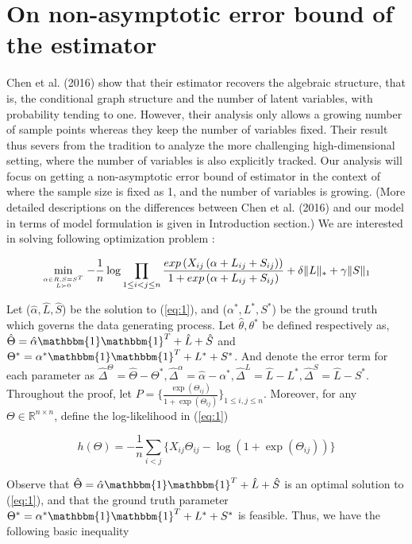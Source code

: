 \documentclass{article}
\begin{document}
\section{On non-asymptotic error bound of the estimator}
Chen et al. (2016) show that their estimator recovers the algebraic structure, that is, the conditional graph structure and the number of latent variables, with probability tending to one. However, their analysis only allows a growing number of sample points whereas they keep the number of variables fixed. Their result thus severs from the tradition to analyze the more challenging high-dimensional setting, where the number of variables is also explicitly tracked. Our analysis will focus on getting a non-asymptotic error bound of estimator in the context of where the sample size is fixed as 1, and the number of variables is growing. (More detailed descriptions on the differences between Chen et al. (2016) and our model in terms of model formulation is given in Introduction section.) We are interested in solving following optimization problem : 

\begin{equation}\label{eq:1}
\min\limits_{\alpha \in R, S = S^T \atop L \succ 0}   
-\frac{1}{n} \log \prod_{1\le i< j\le n}\frac{exp\left(X_{ij}\left(\alpha+
L_{ij}+S_{ij}\right)\right)}{1+exp\left(\alpha+
L_{ij}+S_{ij}\right)} + \delta \|L\|_\ast + \gamma \|S\|_1
\end{equation}



Let ($\hat{\alpha},\hat{L},\hat{S}$) be the solution to (\ref{eq:1}), and ($\alpha^{*},L^{*},S^{*}$) be the ground truth which governs the data generating process. Let $\hat{\theta},\theta^{*}$ be defined respectively as, $\hat{\Theta} = \hat{\alpha}\mathbbm{1}\mathbbm{1}^T+\hat{L}+\hat{S}$ and
$\Theta^{*} = \alpha^{*}\mathbbm{1}\mathbbm{1}^T+L^{*}+S^{*}$.
And denote the error term for each parameter as $\hat{\Delta}^{\Theta} = \hat{\Theta}-\Theta^{*}, 
\hat{\Delta}^{\alpha} = \hat{\alpha}-\alpha^{*},
\hat{\Delta}^L = \hat{L}-L^{*},
\hat{\Delta}^S = \hat{L}-S^{*}.$
Throughout the proof, let $P= \Big\{\frac{\exp(\Theta_{ij})}{1+\exp(\Theta_{ij})}\Big\}_{1 \leq i,j \leq n}$. Moreover, for any $\Theta \in \mathbb{R}^{n\times n}$, define the log-likelihood in (\ref{eq:1}) 

\[
h(\Theta) = -\frac{1}{n}\sum_{i<j} \Big\{ X_{ij}\Theta_{ij} - \log(1+\exp(\Theta_{ij})) \Big\}
\]

Observe that 
$\hat{\Theta} = \hat{\alpha}\mathbbm{1}\mathbbm{1}^T+\hat{L}+\hat{S}$
is an optimal solution to (\ref{eq:1}), and that the ground truth parameter
$\Theta^{*} = \alpha^{*}\mathbbm{1}\mathbbm{1}^T+L^{*}+S^{*}$ is feasible. Thus, we have the following basic inequality
\end{document}

